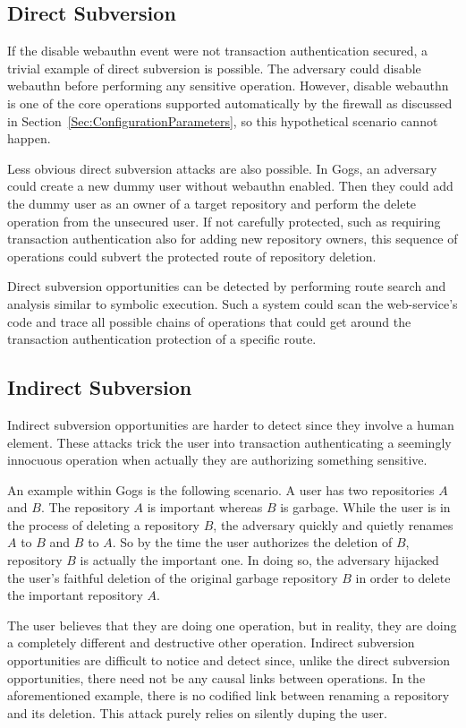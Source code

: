 \subsection{Direct Subversion}
If the disable webauthn event were not transaction authentication secured, a trivial example of direct subversion is possible. The adversary could disable webauthn before performing any sensitive operation. However, disable webauthn is one of the core operations supported automatically by the firewall as discussed in Section~\ref{Sec:ConfigurationParameters}, so this hypothetical scenario cannot happen.

Less obvious direct subversion attacks are also possible. In Gogs, an adversary could create a new dummy user without webauthn enabled. Then they could add the dummy user as an owner of a target repository and perform the delete operation from the unsecured user. If not carefully protected, such as requiring transaction authentication also for adding new repository owners, this sequence of operations could subvert the protected route of repository deletion.

Direct subversion opportunities can be detected by performing route search and analysis similar to symbolic execution. Such a system could scan the web-service's code and trace all possible chains of operations that could get around the transaction authentication protection of a specific route.

\subsection{Indirect Subversion}
Indirect subversion opportunities are harder to detect since they involve a human element. These attacks trick the user into transaction authenticating a seemingly innocuous operation when actually they are authorizing something sensitive. 

An example within Gogs is the following scenario. A user has two repositories $A$ and $B$. The repository $A$ is important whereas $B$ is garbage. While the user is in the process of deleting a repository $B$, the adversary quickly and quietly renames $A$ to $B$ and $B$ to $A$. So by the time the user authorizes the deletion of $B$, repository $B$ is actually the important one. In doing so, the adversary hijacked the user's faithful deletion of the original garbage repository $B$ in order to delete the important repository $A$. 

The user believes that they are doing one operation, but in reality, they are doing a completely different and destructive other operation. Indirect subversion opportunities are difficult to notice and detect since, unlike the direct subversion opportunities, there need not be any causal links between operations. In the aforementioned example, there is no codified link between renaming a repository and its deletion. This attack purely relies on silently duping the user.

